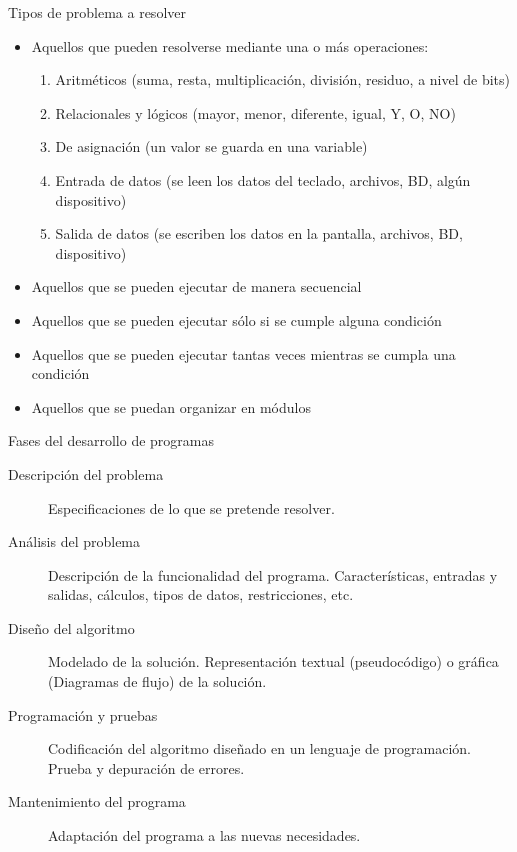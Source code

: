 \begin{frame}[c]{Tipos de problema a resolver}
  \begin{itemize}
    \item Aquellos que pueden resolverse mediante una o más operaciones:
      \begin{enumerate}
        \item Aritméticos (suma, resta, multiplicación, división, residuo,
          a nivel de bits)
        \pausa
        \item Relacionales y lógicos (mayor, menor, diferente, igual, Y, O, NO)
        \pausa
        \item De asignación (un valor se guarda en una variable)
        \pausa
        \item Entrada de datos (se leen los datos del teclado, archivos, BD,
          algún dispositivo)
        \pausa
        \item Salida de datos (se escriben los datos en la pantalla, archivos,
          BD, dispositivo)
      \end{enumerate}
    \pausa
    \item Aquellos que se pueden ejecutar de manera secuencial
    \pausa
    \item Aquellos que se pueden ejecutar sólo si se cumple alguna condición
    \pausa
    \item Aquellos que se pueden ejecutar tantas veces mientras se cumpla una
      condición
    \pausa
    \item Aquellos que se puedan organizar en módulos
  \end{itemize}
\end{frame}

\begin{frame}[c]{Fases del desarrollo de programas}
  \begin{description}
    \item[Descripción del problema] Especificaciones de lo que se pretende
      resolver.
    \pausa
    \item[Análisis del problema] Descripción de la funcionalidad del programa.
      Características, entradas y salidas, cálculos, tipos de datos,
      restricciones, etc.
    \pausa
    \item[Diseño del algoritmo] Modelado de la solución. Representación
      textual (pseudocódigo) o gráfica (Diagramas de flujo) de la solución.
    \pausa
    \item[Programación y pruebas] Codificación del algoritmo diseñado en un
      lenguaje de programación. Prueba y depuración de errores.
    \pausa
    \item[Mantenimiento del programa] Adaptación del programa a las nuevas
      necesidades.
  \end{description}
\end{frame}

